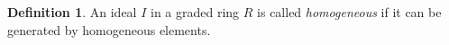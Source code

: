 \documentclass{amsart}[12pt]
\numberwithin{equation}{section}
\theoremstyle{plain} %
\theoremstyle{definition}
\newtheorem{definition}[equation]{Definition}
\theoremstyle{remark}
\newtheorem{remark}[equation]{Remark}
\begin{document}
%	



\begin{definition}
	An ideal $I$ in a graded ring $R$ is called \emph{homogeneous} if it can be generated by homogeneous elements.
\end{definition}
\end{document}
